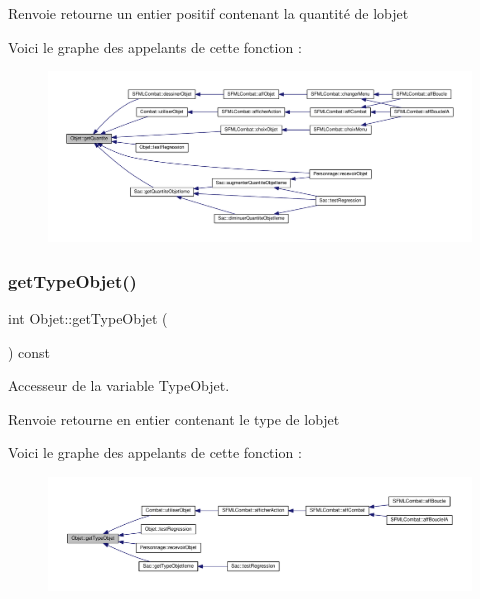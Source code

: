 \begin{DoxyReturn}{Renvoie}
retourne un entier positif contenant la quantité de l\textquotesingle{}objet 
\end{DoxyReturn}
Voici le graphe des appelants de cette fonction \+:\nopagebreak
\begin{figure}[H]
\begin{center}
\leavevmode
\includegraphics[width=350pt]{class_objet_a3352afeefcae6415b3c73112fd588ab5_icgraph}
\end{center}
\end{figure}
\mbox{\label{class_objet_ab75ba7bf1170582a4d50ba8848be2848}} 
\subsubsection{\texorpdfstring{get\+Type\+Objet()}{getTypeObjet()}}
{\footnotesize\ttfamily int Objet\+::get\+Type\+Objet (\begin{DoxyParamCaption}{ }\end{DoxyParamCaption}) const}



Accesseur de la variable Type\+Objet. 

\begin{DoxyReturn}{Renvoie}
retourne en entier contenant le type de l\textquotesingle{}objet 
\end{DoxyReturn}
Voici le graphe des appelants de cette fonction \+:\nopagebreak
\begin{figure}[H]
\begin{center}
\leavevmode
\includegraphics[width=350pt]{class_objet_ab75ba7bf1170582a4d50ba8848be2848_icgraph}
\end{center}
\end{figure}
\mbox{\label{class_objet_a9e4b0fb73f3a95425f0239c91c7513f4}} 
